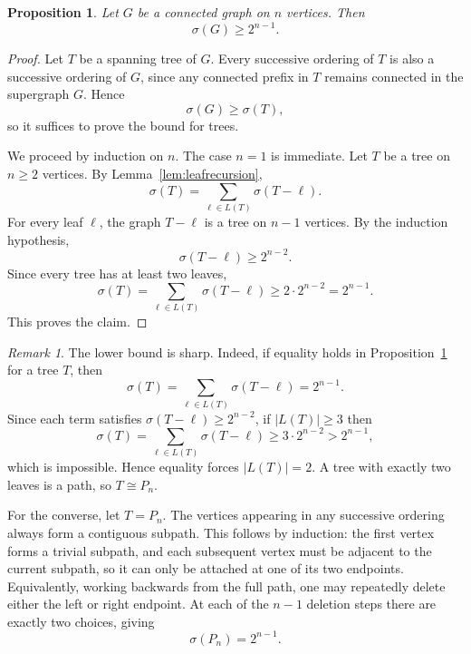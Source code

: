 \documentclass[11pt,a4paper]{article}
\numberwithin{equation}{section}
\theoremstyle{plain}
\newtheorem{proposition}[theorem]{Proposition}
\theoremstyle{definition}
\theoremstyle{remark}
\newtheorem{remark}[theorem]{Remark}
\begin{document}
\begin{proposition}
\label{prop:lowerbound}
Let \(G\) be a connected graph on \(n\) vertices. Then
\[
\sigma(G)\ge 2^{n-1}.
\]
\end{proposition}

\begin{proof}
Let \(T\) be a spanning tree of \(G\). Every successive ordering of \(T\) is also a successive ordering of \(G\), since any connected prefix in \(T\) remains connected in the supergraph \(G\). Hence
\[
\sigma(G)\ge \sigma(T),
\]
so it suffices to prove the bound for trees.

We proceed by induction on \(n\). The case \(n=1\) is immediate. Let \(T\) be a tree on \(n\ge2\) vertices. By Lemma~\ref{lem:leafrecursion},
\[
\sigma(T)
=
\sum_{\ell\in L(T)}
\sigma(T-\ell).
\]
For every leaf \(\ell\), the graph \(T-\ell\) is a tree on \(n-1\) vertices. By the induction hypothesis,
\[
\sigma(T-\ell)\ge 2^{n-2}.
\]
Since every tree has at least two leaves,
\[
\sigma(T)
=
\sum_{\ell\in L(T)}
\sigma(T-\ell)
\ge
2\cdot 2^{n-2}
=
2^{n-1}.
\]
This proves the claim.
\end{proof}

\begin{remark}
The lower bound is sharp. Indeed, if equality holds in Proposition~\ref{prop:lowerbound} for a tree \(T\), then
\[
\sigma(T)
=
\sum_{\ell\in L(T)}
\sigma(T-\ell)
=
2^{n-1}.
\]
Since each term satisfies \(\sigma(T-\ell)\ge 2^{n-2}\), if \(|L(T)|\ge 3\) then
\[
\sigma(T)
=
\sum_{\ell\in L(T)}
\sigma(T-\ell)
\ge
3\cdot 2^{n-2}
>
2^{n-1},
\]
which is impossible. Hence equality forces \(|L(T)|=2\). A tree with exactly two leaves is a path, so \(T\cong P_n\).

For the converse, let \(T=P_n\). The vertices appearing in any successive ordering always form a contiguous subpath. This follows by induction: the first vertex forms a trivial subpath, and each subsequent vertex must be adjacent to the current subpath, so it can only be attached at one of its two endpoints. Equivalently, working backwards from the full path, one may repeatedly delete either the left or right endpoint. At each of the \(n-1\) deletion steps there are exactly two choices, giving
\[
\sigma(P_n)=2^{n-1}.
\]
\end{remark}



\end{document}
